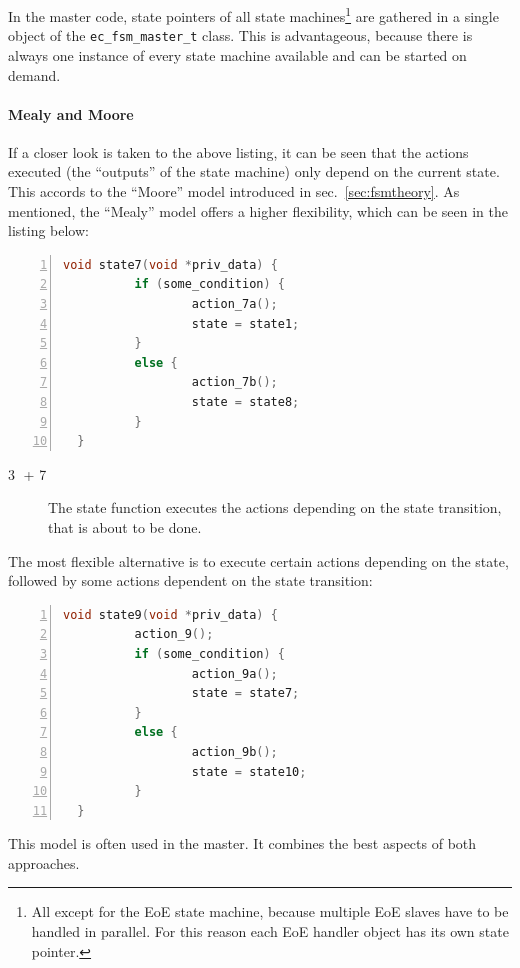 \documentclass[a4paper,12pt,BCOR6mm,bibtotoc,idxtotoc]{scrbook}
\newcommand{\linenum}[1]{\normalfont\textcircled{\tiny #1}}
\begin{document}
In the master code, state pointers of all state machines\footnote{All except
for the EoE state machine, because multiple EoE slaves have to be handled in
parallel. For this reason each EoE handler object has its own state pointer.}
are gathered in a single object of the \lstinline+ec_fsm_master_t+ class. This
is advantageous, because there is always one instance of every state machine
available and can be started on demand.

\paragraph{Mealy and Moore}

If a closer look is taken to the above listing, it can be seen that the
actions executed (the ``outputs'' of the state machine) only depend on the
current state. This accords to the ``Moore'' model introduced in
sec.~\ref{sec:fsmtheory}. As mentioned, the ``Mealy'' model offers a higher
flexibility, which can be seen in the listing below:

\begin{lstlisting}[gobble=2,language=C,numbers=left]
  void state7(void *priv_data) {
          if (some_condition) {
                  action_7a();
                  state = state1;
          }
          else {
                  action_7b();
                  state = state8;
          }
  }
\end{lstlisting}

\begin{description}

\item[\linenum{3} + \linenum{7}] The state function executes the actions
depending on the state transition, that is about to be done.

\end{description}

The most flexible alternative is to execute certain actions depending
on the state, followed by some actions dependent on the state
transition:

\begin{lstlisting}[gobble=2,language=C,numbers=left]
  void state9(void *priv_data) {
          action_9();
          if (some_condition) {
                  action_9a();
                  state = state7;
          }
          else {
                  action_9b();
                  state = state10;
          }
  }
\end{lstlisting}

This model is often used in the master. It combines the best aspects of both
approaches.
\end{document}
